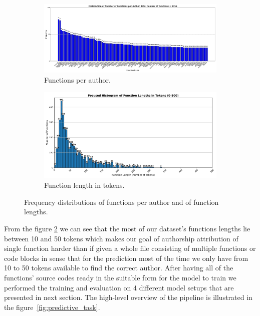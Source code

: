 \documentclass[conference]{IEEEtran}
\begin{document}
\begin{figure}[!t]
    \centering
    \begin{subfigure}{0.48\textwidth}
      \includegraphics[width=\linewidth]{figures/distribution_names.pdf}
      \caption{Functions per author.}
      \label{fig:distr_names}
    \end{subfigure}%
    \hfill
    \begin{subfigure}{0.48\textwidth}
      \includegraphics[width=\linewidth]{figures/distr_lens_tokens.pdf}
      \caption{Function length in tokens.}
      \label{fig:distr_lens}
    \end{subfigure}
    \caption{Frequency distributions of functions per author and of function lengths.}
    \label{fig:eda_distr}
  \end{figure}
  


From the figure \ref{fig:distr_lens} we can see that the most of our dataset's 
functions lengths lie between 10 and 50 tokens which makes our goal of authorship attribution of single function
harder than if given a whole file consisting of multiple functions or code blocks in sense that for the prediction
most of the time we only have from 10 to 50 tokens available to find the correct author.
After having all of the functions' source codes ready in the suitable form for the model to train we 
performed the training and evaluation on 4 different model setups that are presented in next section.
The high-level overview of the pipeline is illustrated in the figure~\ref{fig:predictive_task}.
\end{document}
